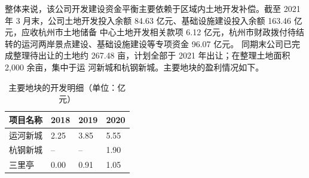 \documentclass[H:\workspace\担保人财务信息2\杭州大运河\HangZhouText.tex]{subfiles}
\begin{document}
整体来说，该公司开发建设资金平衡主要依赖于区域内土地开发补偿。截至 2021 年 3 月末，公司土地开发投入余额 84.63 亿元、基础设施建设投入余额 163.46 亿元，应收杭州市土地储备
中心土地开发相关款项 6.12 亿元，杭州市财政拨付待结转的运河两岸景点建设、基础设施建设等专项资金 96.07 亿元。
同期末公司已完成整理待出让的土地约 267.48 亩，计划全部于 2021 年出让；在整理土地面积 2,000 余亩，集中于运
河新城和杭钢新城。主要地块的盈利情况如下。
\begin{table}[H]
    \centering 
    \xiaowuhao 
    \setlength{\tabcolsep}{1.2em} %
    {\renewcommand{\arraystretch}{0.5} %
    \begin{tabular}{@{} p{3cm}|p{2cm}|p{2cm}|p{2cm} @{}}
        \toprule 
        项目名称 & 2018 & 2019 & 2020 \\
        \midrule 
        运河新城 & 2.25 & 3.85 & 5.55 \\
        杭钢新城 & -- & -- & 1.90 \\
        三里亭 & 0.00\footnotemark & 0.91 & 1.05 \\
        \bottomrule
    \end{tabular}
    }
    \caption{主要地块的开发明细（单位：亿元）}
\end{table}
\end{document}

